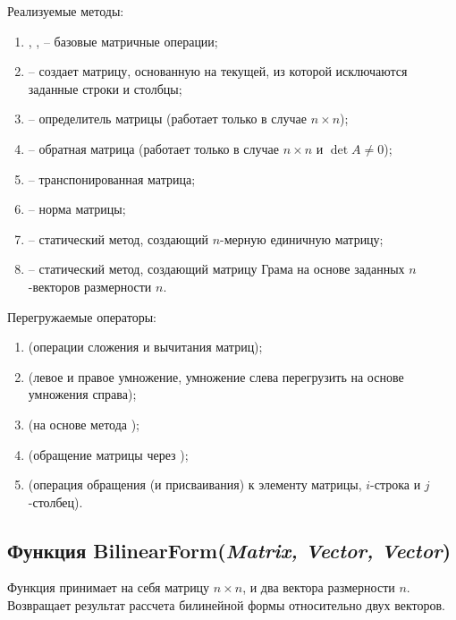 	\noindent Реализуемые методы:
	\begin{enumerate}
		\item {}, , \newline {} -- базовые матричные операции;
		\item {} -- создает матрицу, основанную на текущей, из которой исключаются заданные строки и столбцы;
		\item {} -- определитель матрицы (работает только в случае \(n \times n\));
		\item {} -- обратная матрица (работает только в случае \(n \times n\) и \( \det{A} \neq 0 \));
		\item {} -- транспонированная матрица;
		\item {} -- норма матрицы;
		\item {} -- статический метод, создающий $n$-мерную единичную матрицу;
		\item {} -- статический метод, создающий матрицу Грама на основе заданных $n$-векторов размерности $n$.
	\end{enumerate}

	\noindent Перегружаемые операторы:
	\begin{enumerate}
		\item {} (операции сложения и вычитания матриц);
		\item {} (левое и правое умножение, умножение слева перегрузить на основе умножения справа);
		\item {} (на основе метода );
		\item {} (обращение матрицы через );
		\item {} (операция обращения (и присваивания) к элементу матрицы, $i$-строка и $j$-столбец).
	\end{enumerate}


\subsection{Функция BilinearForm(\textit{Matrix, Vector, Vector})}
	\noindent Функция принимает на себя матрицу $n \times n$, и два вектора размерности $n$. Возвращает результат рассчета билинейной формы относительно двух векторов.


